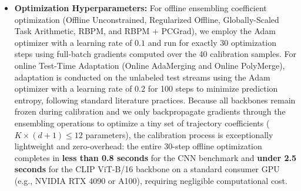 \begin{itemize}
    \item \textbf{Optimization Hyperparameters:} For offline ensembling coefficient optimization (Offline Unconstrained, Regularized Offline, Globally-Scaled Task Arithmetic, RBPM, and RBPM + PCGrad), we employ the Adam optimizer \cite{kingma2014adam} with a learning rate of $0.1$ and run for exactly 30 optimization steps using full-batch gradients computed over the 40 calibration samples. For online Test-Time Adaptation (Online AdaMerging and Online PolyMerge), adaptation is conducted on the unlabeled test streams using the Adam optimizer with a learning rate of $0.2$ for 100 steps to minimize prediction entropy, following standard literature practices. Because all backbones remain frozen during calibration and we only backpropagate gradients through the ensembling operations to optimize a tiny set of trajectory coefficients ($K \times (d+1) \le 12$ parameters), the calibration process is exceptionally lightweight and zero-overhead: the entire 30-step offline optimization completes in \textbf{less than 0.8 seconds} for the CNN benchmark and \textbf{under 2.5 seconds} for the CLIP ViT-B/16 backbone on a standard consumer GPU (e.g., NVIDIA RTX 4090 or A100), requiring negligible computational cost.
\end{itemize}

